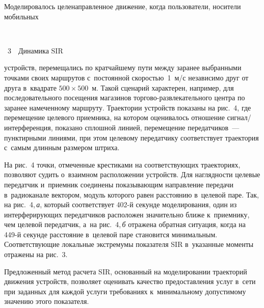 \begin{multicols}{2}
  
     
  Моделировалось целенаправленное движение, когда пользователи, 
носители мобильных\linebreak\vspace*{-12pt}

{ \begin{center}  %
 \vspace*{0.5pt}
  \mbox{%
 \epsfxsize=79mm 
 }


\vspace*{6pt}


\noindent
{{\figurename~3}\ \ \small{Динамика SIR}}
\end{center}
}

\vspace*{6pt}

\addtocounter{figure}{1}

\noindent
 устройств, перемещались по кратчайшему пути между 
заранее выбранными точ\-ка\-ми своих маршрутов с~по\-сто\-ян\-ной 
ско\-ростью~1~м/с независимо друг от друга в~квад\-ра\-те $500\times500$~м. 
Такой сценарий характерен, например, для последовательного посещения 
магазинов тор\-го\-во-раз\-вле\-ка\-тель\-но\-го цент\-ра по заранее 
намеченному маршруту. Траектории устройств показаны на рис.~4, где 
перемещение целевого приемника, на котором оценивалось отношение 
сигнал/\-ин\-тер\-фе\-рен\-ция, показано сплош\-ной линией, перемещение 
передатчиков~--- пунктирными линиями, при этом целевому передатчику 
соответствует траектория с~самым длинным размером штриха. 
  
  На рис.~4 точки, отмеченные крестиками на соответствующих 
траекториях, позволяют судить о~взаимном расположении устройств. Для 
на\-гляд\-ности целевые передатчик и~приемник соединены показывающим 
на\-прав\-ле\-ние передачи в~радиоканале вектором, модуль которого равен 
рас\-сто\-янию в~целевой паре. Так, на рис.~4,\,\textit{а}, который соответствует 
402-й секунде моделирования, один из интерферирующих передатчиков 
расположен значительно ближе к~приемнику, чем целевой передатчик, а~на 
рис.~4,\,\textit{б} отражена обратная ситуация, когда на 449-й секунде 
расстояние в~целевой паре становится минимальным. Соответствующие 
локальные экстремумы показателя SIR в~указанные моменты отражены на 
рис.~3.
  
  
  Предложенный метод расчета SIR, основанный на моделировании 
траекторий движения устройств, поз\-во\-ля\-ет оценивать качество 
предо\-став\-ле\-ния услуг в~сети при заданных для каждой услуги требованиях 
к~минимальному допустимому значению этого показателя.


\end{multicols}
